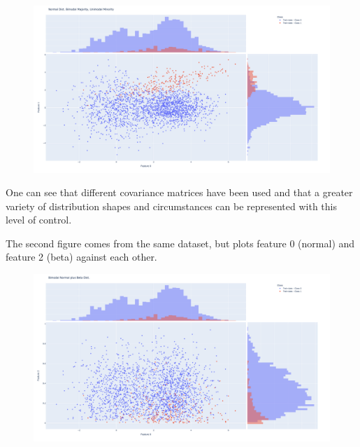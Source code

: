 \begin{figure}[H]
	\centering
  	\includegraphics[width=\linewidth]{assets/data_vis/Normal_Dist_Bimodal.png}
  	\label{fig:Bimodal Normal}
\end{figure}

One can see that different covariance matrices have been used 
and that a greater variety of distribution shapes and circumstances can be represented with this level of control.

The second figure comes from the same dataset, but plots feature 0 (normal) and feature 2 (beta) against each other.

\begin{figure}[H]
  	\centering
  	\includegraphics[width=\linewidth]{assets/data_vis/Normal_Beta.png}
  	\label{fig:Normal plus Beta}
\end{figure}

